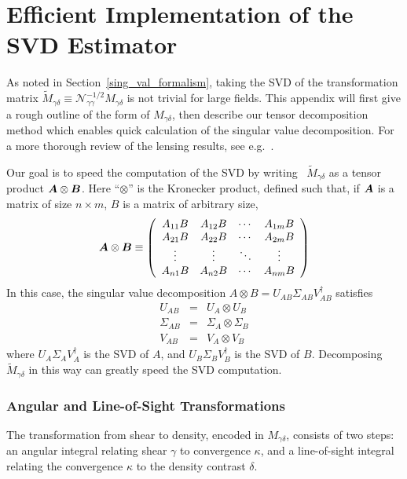 \chapter{Efficient Implementation of the SVD Estimator}
\label{appB}
As noted in Section~\ref{sing_val_formalism}, taking the SVD of the 
transformation matrix $\widetilde{M}_{\gamma\delta} \equiv 
\mathcal{N}_{\gamma\gamma}^{-1/2}M_{\gamma\delta}$
is not trivial for large fields.  This appendix will first give a rough
outline of the form of $M_{\gamma\delta}$, then describe our tensor 
decomposition method which enables quick calculation of the singular
value decomposition.  For a more thorough review of the lensing results, 
see e.g.~\citet{Bartelmann01}.

Our goal is to speed the computation of the SVD by writing \
$\widetilde{M}_{\gamma\delta}$
as a tensor product $\boldsymbol{A} \otimes \boldsymbol{B}$.  Here ``$\otimes$''
is the Kronecker product, defined such that, if $\boldsymbol{A}$ is a matrix
of size $n \times m$, $B$ is a matrix of arbitrary size,
\begin{equation}
  \boldsymbol{A}\otimes\boldsymbol{B} \equiv \left(
  \begin{array}{cccc}
    A_{11}B & A_{12}B & \cdots & A_{1m}B \\
    A_{21}B & A_{22}B & \cdots & A_{2m}B \\
    \vdots  & \vdots & \ddots & \vdots  \\
    A_{n1}B & A_{n2}B & \cdots & A_{nm}B 
  \end{array}\right)
\end{equation}
In this case, the singular value decomposition
$A\otimes B = U_{AB}\Sigma_{AB}V^\dagger_{AB}$
satisfies
\begin{eqnarray}
  \label{AB_SVD}
  U_{AB} &=& U_A\otimes U_B \nonumber\\
  \Sigma_{AB} &=& \Sigma_A \otimes \Sigma_B\nonumber\\
  V_{AB} &=& V_A \otimes V_B
\end{eqnarray}
where $U_A\Sigma_AV^\dagger_A$ is the SVD of $A$, 
and   $U_B\Sigma_BV^\dagger_B$ is the SVD of $B$.
Decomposing $\widetilde{M}_{\gamma\delta}$ in this way can 
greatly speed the SVD computation.

\subsection{Angular and Line-of-Sight Transformations}
The transformation from shear to density, encoded in $M_{\gamma\delta}$,
consists of two steps: an angular integral relating shear $\gamma$ to
convergence $\kappa$, and a line-of-sight integral relating the convergence
$\kappa$ to the density contrast $\delta$.

